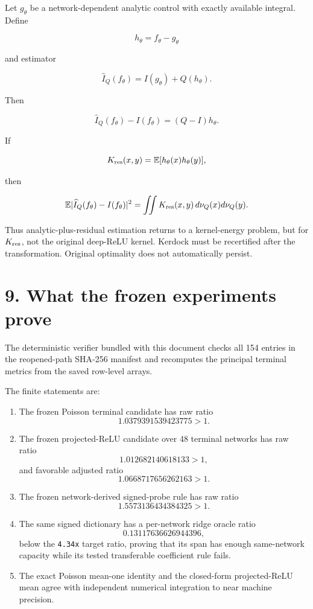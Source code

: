 \documentclass[
  10pt,
]{article}
\providecommand{\tightlist}{%
  \setlength{\itemsep}{0pt}\setlength{\parskip}{0pt}}
\begin{document}
Let \(g_\theta\) be a network-dependent analytic control with exactly
available integral. Define

\[
h_\theta=f_\theta-g_\theta
\]

and estimator

\[
\widehat I_Q(f_\theta)=I(g_\theta)+Q(h_\theta).
\]

Then

\[
\widehat I_Q(f_\theta)-I(f_\theta)
=(Q-I)h_\theta.
\]

If

\[
K_{\rm res}(x,y)
=
\mathbb E[h_\theta(x)h_\theta(y)],
\]

then

\[
\mathbb E|
\widehat I_Q(f_\theta)-I(f_\theta)
|^2
=
\iint K_{\rm res}(x,y)\,d\nu_Q(x)d\nu_Q(y).
\]

Thus analytic-plus-residual estimation returns to a kernel-energy
problem, but for \(K_{\rm res}\), not the original deep-ReLU kernel.
Kerdock must be recertified after the transformation. Original
optimality does not automatically persist.

\section{9. What the frozen experiments
prove}\label{what-the-frozen-experiments-prove}

The deterministic verifier bundled with this document checks all 154
entries in the reopened-path SHA-256 manifest and recomputes the
principal terminal metrics from the saved row-level arrays.

The finite statements are:

\begin{enumerate}
\def\labelenumi{\arabic{enumi}.}
\tightlist
\item
  The frozen Poisson terminal candidate has raw ratio \[
  1.0379391539423775>1.
  \]
\item
  The frozen projected-ReLU candidate over 48 terminal networks has raw
  ratio \[
  1.012682140618133>1,
  \] and favorable adjusted ratio \[
  1.0668717656262163>1.
  \]
\item
  The frozen network-derived signed-probe rule has raw ratio \[
  1.5573136434384325>1.
  \]
\item
  The same signed dictionary has a per-network ridge oracle ratio \[
  0.13117636626944396,
  \] below the \texttt{4.34x} target ratio, proving that its span has
  enough same-network capacity while its tested transferable coefficient
  rule fails.
\item
  The exact Poisson mean-one identity and the closed-form projected-ReLU
  mean agree with independent numerical integration to near machine
  precision.
\end{enumerate}
\end{document}
